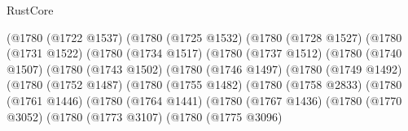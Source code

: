 \begin{lexlean}{RustCore}
\begin{coremodule}
                                        (@1780
                                          (@1722 @1537)
                                          (@1780
                                            (@1725 @1532)
                                            (@1780
                                              (@1728 @1527)
                                              (@1780
                                                (@1731 @1522)
                                                (@1780
                                                  (@1734 @1517)
                                                  (@1780
                                                    (@1737 @1512)
                                                    (@1780
                                                      (@1740 @1507)
                                                      (@1780
                                                        (@1743 @1502)
                                                        (@1780
                                                          (@1746 @1497)
                                                          (@1780
                                                            (@1749 @1492)
                                                            (@1780
                                                              (@1752 @1487)
                                                              (@1780
                                                                (@1755 @1482)
                                                                (@1780
                                                                  (@1758 @2833)
                                                                  (@1780
                                                                    (@1761 @1446)
                                                                    (@1780
                                                                      (@1764 @1441)
                                                                      (@1780
                                                                        (@1767 @1436)
                                                                        (@1780
                                                                          (@1770 @3052)
                                                                          (@1780
                                                                            (@1773 @3107)
                                                                            (@1780
                                                                              (@1775 @3096)

\end{coremodule}
\end{lexlean}
